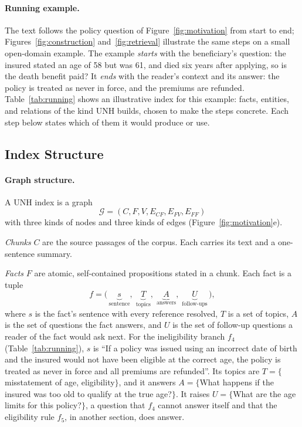 \documentclass[sigconf, review, anonymous]{acmart}
\newcommand{\sys}{UNH}
\newcommand{\Ecf}{E_{CF}}
\newcommand{\Efv}{E_{FV}}
\newcommand{\Eff}{E_{FF}}
\begin{document}
\paragraph{\textbf{Running example.}}
The text follows the policy question of Figure~\ref{fig:motivation} from start to end; Figures~\ref{fig:construction} and~\ref{fig:retrieval} illustrate the same steps on a small open-domain example. The example \emph{starts} with the beneficiary's question: the insured stated an age of 58 but was 61, and died six years after applying, so is the death benefit paid? It \emph{ends} with the reader's context and its answer: the policy is treated as never in force, and the premiums are refunded. Table~\ref{tab:running} shows an illustrative index for this example: facts, entities, and relations of the kind \sys{} builds, chosen to make the steps concrete. Each step below states which of them it would produce or use.

\subsection{Index Structure}
\label{sec:index}

\paragraph{\textbf{Graph structure.}}
A \sys{} index is a graph
\[
  \mathcal{G} = (C, F, V, \Ecf, \Efv, \Eff)
\]
with three kinds of nodes and three kinds of edges (Figure~\ref{fig:motivation}e).

\textit{Chunks} $C$ are the source passages of the corpus. Each carries its text and a one-sentence summary.

\textit{Facts} $F$ are atomic, self-contained propositions stated in a chunk. Each fact is a tuple
\[
  f = \bigl(\,\underbrace{s}_{\text{sentence}},\;
             \underbrace{T}_{\text{topics}},\;
             \underbrace{A}_{\text{answers}},\;
             \underbrace{U}_{\text{follow-ups}}\,\bigr),
\]
where $s$ is the fact's sentence with every reference resolved, $T$ is a set of topics, $A$ is the set of questions the fact answers, and $U$ is the set of follow-up questions a reader of the fact would ask next. For the ineligibility branch $f_4$ (Table~\ref{tab:running}), $s$ is ``If a policy was issued using an incorrect date of birth and the insured would not have been eligible at the correct age, the policy is treated as never in force and all premiums are refunded''. Its topics are $T = \{$misstatement of age, eligibility$\}$, and it answers $A = \{$What happens if the insured was too old to qualify at the true age?$\}$. It raises $U = \{$What are the age limits for this policy?$\}$, a question that $f_4$ cannot answer itself and that the eligibility rule $f_5$, in another section, does answer.
\end{document}
